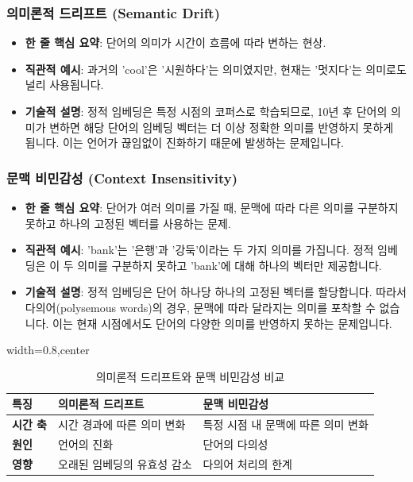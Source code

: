 \documentclass[11pt,a4paper]{article}
\begin{document}
\subsubsection{의미론적 드리프트 (Semantic Drift)}
\begin{itemize}
    \item \textbf{한 줄 핵심 요약}: 단어의 의미가 시간이 흐름에 따라 변하는 현상.
    \item \textbf{직관적 예시}: 과거의 'cool'은 '시원하다'는 의미였지만, 현재는 '멋지다'는 의미로도 널리 사용됩니다.
    \item \textbf{기술적 설명}: 정적 임베딩은 특정 시점의 코퍼스로 학습되므로, 10년 후 단어의 의미가 변하면 해당 단어의 임베딩 벡터는 더 이상 정확한 의미를 반영하지 못하게 됩니다. 이는 언어가 끊임없이 진화하기 때문에 발생하는 문제입니다.
\end{itemize}

\subsubsection{문맥 비민감성 (Context Insensitivity)}
\begin{itemize}
    \item \textbf{한 줄 핵심 요약}: 단어가 여러 의미를 가질 때, 문맥에 따라 다른 의미를 구분하지 못하고 하나의 고정된 벡터를 사용하는 문제.
    \item \textbf{직관적 예시}: 'bank'는 '은행'과 '강둑'이라는 두 가지 의미를 가집니다. 정적 임베딩은 이 두 의미를 구분하지 못하고 'bank'에 대해 하나의 벡터만 제공합니다.
    \item \textbf{기술적 설명}: 정적 임베딩은 단어 하나당 하나의 고정된 벡터를 할당합니다. 따라서 다의어(polysemous words)의 경우, 문맥에 따라 달라지는 의미를 포착할 수 없습니다. 이는 현재 시점에서도 단어의 다양한 의미를 반영하지 못하는 문제입니다.
\end{itemize}

\begin{table}[h!]
\centering
\caption{의미론적 드리프트와 문맥 비민감성 비교}
\label{tab:drift_vs_insensitivity}
\begin{adjustbox}{width=0.8\textwidth,center}
\begin{tabular}{lll}
\toprule
\textbf{특징} & \textbf{의미론적 드리프트} & \textbf{문맥 비민감성} \\
\midrule
\textbf{시간 축} & 시간 경과에 따른 의미 변화 & 특정 시점 내 문맥에 따른 의미 변화 \\
\textbf{원인} & 언어의 진화 & 단어의 다의성 \\
\textbf{영향} & 오래된 임베딩의 유효성 감소 & 다의어 처리의 한계 \\
\bottomrule
\end{tabular}
\end{adjustbox}
\end{table}
\end{document}
